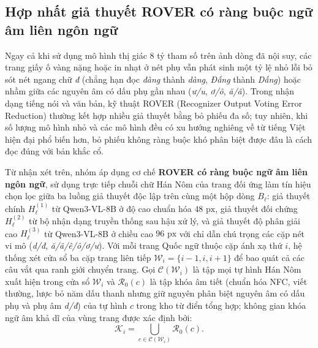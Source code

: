 \subsection{Hợp nhất giả thuyết ROVER có ràng buộc ngữ âm liên ngôn ngữ}

Ngay cả khi sử dụng mô hình thị giác 8 tỷ tham số trên ảnh dòng đã nội suy, các trang giấy ố vàng nặng hoặc in nhạt ở nét phụ vẫn phát sinh một tỷ lệ nhỏ lỗi bỏ sót nét ngang chữ \textit{đ} (chẳng hạn đọc \textit{đàng} thành \textit{dàng}, \textit{Đấng} thành \textit{Dấng}) hoặc nhầm giữa các nguyên âm có dấu phụ gần nhau (\textit{ư/u}, \textit{ơ/ô}, \textit{ă/â}). Trong nhận dạng tiếng nói và văn bản, kỹ thuật ROVER (Recognizer Output Voting Error Reduction) \cite{fiscus1997rover} thường kết hợp nhiều giả thuyết bằng bỏ phiếu đa số; tuy nhiên, khi số lượng mô hình nhỏ và các mô hình đều có xu hướng nghiêng về từ tiếng Việt hiện đại phổ biến hơn, bỏ phiếu không ràng buộc khó phân biệt được đâu là cách đọc đúng với bản khắc cổ.

Từ nhận xét trên, nhóm áp dụng cơ chế \textbf{ROVER có ràng buộc ngữ âm liên ngôn ngữ}, sử dụng trực tiếp chuỗi chữ Hán Nôm của trang đối ứng làm tín hiệu chọn lọc giữa ba luồng giả thuyết độc lập trên cùng một hộp dòng $B_\ell$: giả thuyết chính $H^{(1)}_\ell$ từ Qwen3-VL-8B ở độ cao chuẩn hóa $48\text{ px}$, giả thuyết đối chứng $H^{(2)}_\ell$ từ bộ nhận dạng truyền thống sau hậu xử lý, và giả thuyết độ phân giải cao $H^{(3)}_\ell$ từ Qwen3-VL-8B ở chiều cao $96\text{ px}$ với chỉ dẫn chú trọng các cặp nét vi mô (\textit{d/đ}, \textit{ă/â/ê/ô/ơ/ư}). Với mỗi trang Quốc ngữ thuộc cặp ánh xạ thứ $i$, hệ thống xét cửa sổ ba cặp trang liên tiếp $\mathcal{W}_i = \{i-1, i, i+1\}$ để bao quát cả các câu vắt qua ranh giới chuyển trang. Gọi $\mathcal{C}(\mathcal{W}_i)$ là tập mọi tự hình Hán Nôm xuất hiện trong cửa sổ $\mathcal{W}_i$ và $\mathcal{R}_0(c)$ là tập khóa âm tiết (chuẩn hóa NFC, viết thường, lược bỏ năm dấu thanh nhưng giữ nguyên phân biệt nguyên âm có dấu phụ và phụ âm \textit{d/đ}) của tự hình $c$ trong kho từ điển tổng hợp; không gian khóa ngữ âm khả dĩ của vùng trang được xác định bởi:
\begin{equation}
    \mathcal{K}_i = \bigcup_{c \in \mathcal{C}(\mathcal{W}_i)} \mathcal{R}_0(c).
\end{equation}

